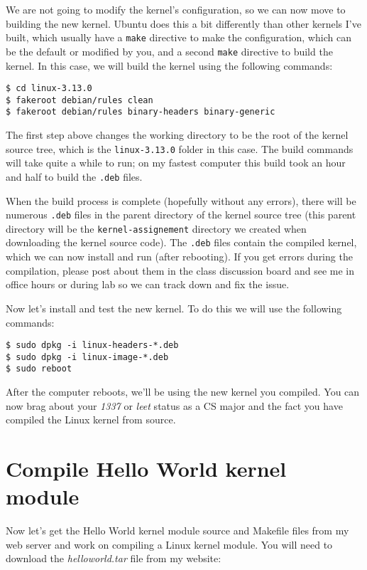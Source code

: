 \documentclass[11pt]{article}
\begin{document}
We are not going to modify the kernel's configuration, so we can now move to building the new kernel. Ubuntu does this a bit differently than other kernels I've built, which usually have a \texttt{make} directive to make the configuration, which can be the default or modified by you, and a second \texttt{make} directive to build the kernel. In this case, we will build the kernel using the following commands:

\begin{verbatim}
$ cd linux-3.13.0
$ fakeroot debian/rules clean
$ fakeroot debian/rules binary-headers binary-generic
\end{verbatim}

The first step above changes the working directory to be the root of the kernel source tree, which is the \texttt{linux-3.13.0} folder in this case. The build commands will take quite a while to run; on my fastest computer this build took an hour and half to build the \texttt{.deb} files. 

When the build process is complete (hopefully without any errors), there will be numerous \texttt{.deb} files in the parent directory of the kernel source tree (this parent directory will be the \texttt{kernel-assignement} directory we created when downloading the kernel source code). The \texttt{.deb} files contain the compiled kernel, which we can now install and run (after rebooting). If you get errors during the compilation, please post about them in the class discussion board and see me in office hours or during lab so we can track down and fix the issue.

Now let's install and test the new kernel. To do this we will use the following commands:

\begin{verbatim}
$ sudo dpkg -i linux-headers-*.deb
$ sudo dpkg -i linux-image-*.deb
$ sudo reboot
\end{verbatim}

After the computer reboots, we'll be using the new kernel you compiled. You can now brag about your \emph{1337} or \emph{leet} status as a CS major and the fact you have compiled the Linux kernel from source. 

\section*{Compile Hello World kernel module}

Now let's get the Hello World kernel module source and Makefile files from my web server and work on compiling a Linux kernel module. You will need to download the {\it helloworld.tar} file from my website:
\end{document}
